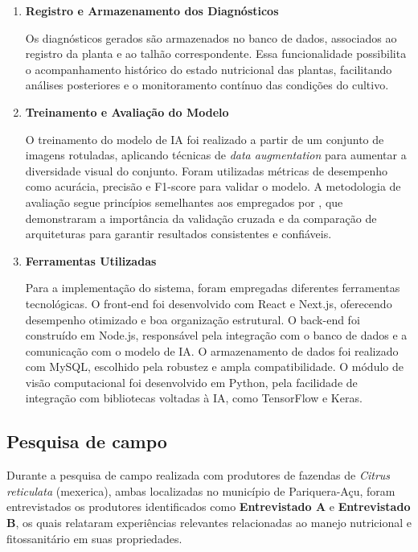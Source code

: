 \begin{enumerate}
\item \textbf{Registro e Armazenamento dos Diagnósticos}

Os diagnósticos gerados são armazenados no banco de dados, associados ao registro da planta e ao talhão correspondente. Essa funcionalidade possibilita o acompanhamento histórico do estado nutricional das plantas, facilitando análises posteriores e o monitoramento contínuo das condições do cultivo.

\item \textbf{Treinamento e Avaliação do Modelo}

O treinamento do modelo de IA foi realizado a partir de um conjunto de imagens rotuladas, aplicando técnicas de \textit{data augmentation} para aumentar a diversidade visual do conjunto. Foram utilizadas métricas de desempenho como acurácia, precisão e F1-score para validar o modelo. A metodologia de avaliação segue princípios semelhantes aos empregados por \textcite{Tran2019}, que demonstraram a importância da validação cruzada e da comparação de arquiteturas para garantir resultados consistentes e confiáveis.

\item \textbf{Ferramentas Utilizadas}

Para a implementação do sistema, foram empregadas diferentes ferramentas tecnológicas. O front-end foi desenvolvido com React e Next.js, oferecendo desempenho otimizado e boa organização estrutural. O back-end foi construído em Node.js, responsável pela integração com o banco de dados e a comunicação com o modelo de IA. O armazenamento de dados foi realizado com MySQL, escolhido pela robustez e ampla compatibilidade. O módulo de visão computacional foi desenvolvido em Python, pela facilidade de integração com bibliotecas voltadas à IA, como TensorFlow e Keras.


\end{enumerate}
\subsection{Pesquisa de campo}
Durante a pesquisa de campo realizada com produtores de fazendas de \textit{Citrus reticulata} (mexerica), ambas localizadas no município de Pariquera-Açu, foram entrevistados os produtores identificados como \textbf{Entrevistado A} e \textbf{Entrevistado B}, os quais relataram experiências relevantes relacionadas ao manejo nutricional e fitossanitário em suas propriedades.

